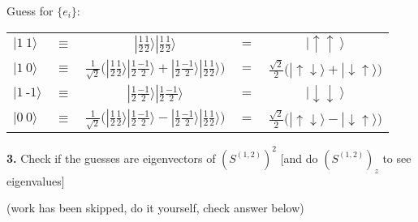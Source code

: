 \documentclass[12pt]{article}
\begin{document}
\begin{minipage}{.58\textwidth}
    Guess for \(\{e_i\}\): \\[15pt]
    { \setlength{\tabcolsep}{3pt}
    \begin{tabular}{l c c c c}
        \( | 1 \ 1 \rangle \)
            & \(\equiv\)
            & \( | \tfrac{1}{2} \tfrac{1}{2} \rangle | \tfrac{1}{2} \tfrac{1}{2} \rangle \)
            & \(=\) 
            &\( | \uparrow \uparrow \ \rangle \) \\[10pt]
        \( | 1 \ 0 \rangle \) 
            & \(\equiv\)
            & \( \tfrac{1}{\sqrt{2}} \Big(
                | \tfrac{1}{2} \tfrac{1}{2} \rangle | \tfrac{1}{2} \tfrac{-1}{2} \rangle +
                | \tfrac{1}{2} \tfrac{-1}{2} \rangle | \tfrac{1}{2} \tfrac{1}{2} \rangle \Big) \)
            & \(=\)
            & \( \tfrac{\sqrt{2}}{2} \big( | {\scriptstyle \uparrow \downarrow} \rangle +
                | {\scriptstyle \downarrow \uparrow} \rangle \big) \) \\[10pt]
        \( | 1 \ \text{-}1 \rangle \)
            & \(\equiv\)
            & \( | \tfrac{1}{2} \tfrac{-1}{2} \rangle | \tfrac{1}{2} \tfrac{-1}{2} \rangle \)
            & \(=\)
            & \( | \downarrow \downarrow \ \rangle \) \\[20pt]
        \( | 0 \ 0 \rangle \)
            & \( \equiv \)
            & \( \tfrac{1}{\sqrt{2}} \Big( 
                | \tfrac{1}{2} \tfrac{1}{2} \rangle | \tfrac{1}{2} \tfrac{-1}{2} \rangle -
                | \tfrac{1}{2} \tfrac{-1}{2} \rangle | \tfrac{1}{2} \tfrac{1}{2} \rangle \Big) \)
            & \(=\)
            & \( \tfrac{\sqrt{2}}{2} \big( | {\scriptstyle \uparrow \downarrow} \rangle - 
                | {\scriptstyle \downarrow \uparrow} \rangle \big) \)
    \end{tabular} }
\end{minipage}

\vspace{25pt} \noindent
\textbf{3.} Check if the guesses are eigenvectors of \(\left( S^{(1,2)} \right)^2\) 
    [and do \(\left( S^{(1,2)} \right)_z\) to see eigenvalues]

{\scriptsize (work has been skipped, do it yourself, check answer below)}
\end{document}
